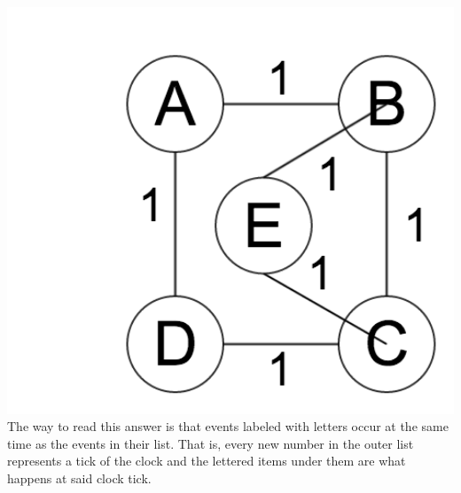 \documentclass[a4paper]{article}
\begin{document}
\includegraphics[width=1\textwidth]{a7q1.png}
The way to read this answer is that events labeled with letters occur at the same time as the events in their list.
That is, every new number in the outer list represents a tick of the clock and the lettered items under them are what happens
at said clock tick.
\end{document}
